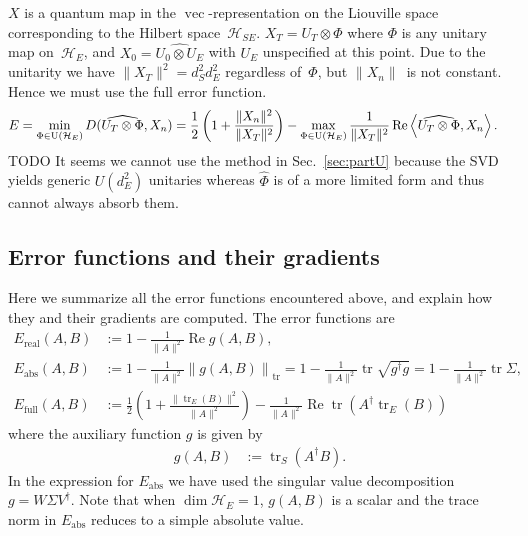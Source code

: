 \documentclass[aps, pra, a4paper, longbibliography, superscriptaddress]{revtex4-1}
\newcommand{\inprod}[2]{\left\langle #1, #2 \right\rangle}
\newcommand{\hilb}[1]{\mathcal{#1}}
\DeclareMathOperator{\tr}{tr}
\DeclareMathOperator{\re}{Re}
\DeclareMathOperator{\cvec}{vec}
\newcommand{\vecop}[1]{\widehat{#1}}
\newcommand{\Xt}{X_T}  %
\newcommand{\Xo}{X_0}  %
\newcommand{\Xn}{X_n}  %
\begin{document}
$X$ is a quantum map in the $\cvec$-representation on the Liouville
space corresponding to the Hilbert space~$\hilb{H}_{SE}$.
$\Xt = \vecop{U_T \otimes \Phi}$
where $\Phi$ is any unitary map on~$\hilb{H}_E$, and
$\Xo = \vecop{U_0 \otimes U_E}$ with $U_E$ unspecified at this point.
Due to the unitarity we have $\|\Xt\|^2 = d_S^2 d_E^2$ regardless of~$\Phi$,
but $\|\Xn\|$~is not constant. Hence we must use the full error function.
\begin{align}
\notag
E
&= \min_{\Phi \in \text{U}(\hilb{H}_E)} D(\vecop{U_T \otimes \Phi}, \Xn)
= \frac{1}{2}\left(1 +\frac{\|\Xn\|^2}{\|\Xt\|^2}\right)
-\max_{\Phi \in \text{U}(\hilb{H}_E)} \frac{1}{\|\Xt\|^2} \re \inprod{\vecop{U_T \otimes \Phi}}{\Xn}.
\end{align}
TODO It seems we cannot use the method in Sec.~\ref{sec:partU}
because the SVD yields generic $U(d_E^2)$ unitaries whereas $\vecop{\Phi}$
is of a more limited form and thus cannot always absorb them.

\subsection{Error functions and their gradients}

Here we summarize all the error functions encountered above, and explain how they and their gradients are computed.
The error functions are
\begin{align}
E_\text{real}(A, B) &:= 1 -\frac{1}{\|A\|^2} \re g(A, B),\\
E_\text{abs}(A, B) &:= 1 -\frac{1}{\|A\|^2} \left\|g(A, B)\right\|_{\tr}
= 1 -\frac{1}{\|A\|^2} \tr \sqrt{g^\dagger g}
= 1 -\frac{1}{\|A\|^2} \tr \Sigma,\\
E_\text{full}(A, B) &:= \frac{1}{2}\left(1 +\frac{\|\tr_E(B)\|^2}{\|A\|^2}\right) -\frac{1}{\|A\|^2} \re \tr(A^\dagger \tr_E(B))
\end{align}
where the auxiliary function $g$ is given by
\begin{align}
g(A, B) &:= \tr_S(A^\dagger B).
\end{align}
In the expression for $E_\text{abs}$ we have used the singular value decomposition $g = W \Sigma V^\dagger$.
Note that when $\dim \hilb{H}_E = 1$, $g(A,B)$ is a scalar and the trace norm in $E_\text{abs}$
reduces to a simple absolute value.
\end{document}

